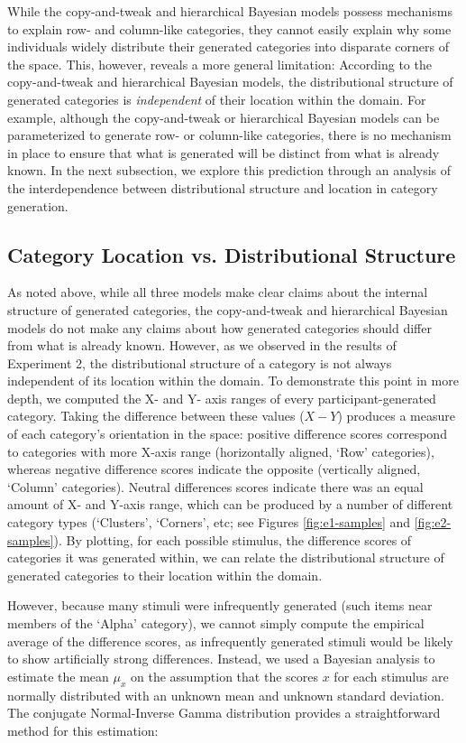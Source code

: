 \documentclass[pdflatex,sn-apa]{sn-jnl}%
\theoremstyle{thmstyleone}%
\theoremstyle{thmstyletwo}%
\theoremstyle{thmstylethree}%
\begin{document}
While the copy-and-tweak and hierarchical Bayesian models possess mechanisms to
explain row- and column-like categories, they cannot easily explain why some
individuals widely distribute their generated categories into disparate corners
of the space. This, however, reveals a more general limitation: According to the
copy-and-tweak and hierarchical Bayesian models, the distributional structure of
generated categories is {\em independent} of their location within the domain.
For example, although the copy-and-tweak or hierarchical Bayesian models can be
parameterized to generate row- or column-like categories, there is no mechanism
in place to ensure that what is generated will be distinct from what is already
known. In the next subsection, we explore this prediction through an analysis of
the interdependence between distributional structure and location in category
generation.

\subsection{Category Location vs. Distributional Structure}
\label{section:individual-diff}
As noted above, while all three models make clear claims about the internal
structure of generated categories, the copy-and-tweak and hierarchical Bayesian
models do not make any claims about how generated categories should differ from
what is already known. However, as we observed in the results of Experiment 2,
the distributional structure of a category is not always independent of its
location within the domain. To demonstrate this point in more depth, we computed
the X- and Y- axis ranges of every participant-generated category. Taking the
difference between these values ($X-Y$) produces a measure of each category's
orientation in the space: positive difference scores correspond to categories
with more X-axis range (horizontally aligned, `Row' categories), whereas
negative difference scores indicate the opposite (vertically aligned, `Column'
categories). Neutral differences scores indicate there was an equal amount of X-
and Y-axis range, which can be produced by a number of different category types
(`Clusters', `Corners', etc; see Figures \ref{fig:e1-samples} and
\ref{fig:e2-samples}). By plotting, for each possible stimulus, the difference
scores of categories it was generated within, we can relate the distributional
structure of generated categories to their location within the domain.

However, because many stimuli were infrequently generated (such items near
members of the `Alpha' category), we cannot simply compute the empirical average
of the difference scores, as infrequently generated stimuli would be likely to
show artificially strong differences. Instead, we used a Bayesian analysis to
estimate the mean $\mu_x$ on the assumption that the scores $x$ for each
stimulus are normally distributed with an unknown mean and unknown standard
deviation. The conjugate Normal-Inverse Gamma distribution provides a
straightforward method for this estimation:
\end{document}
